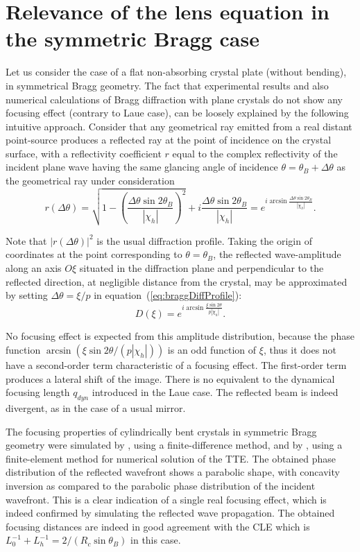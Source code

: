\documentclass[preprint]{iucr}              %
\begin{document}
\section{Relevance of the lens equation in the symmetric Bragg case}
\label{sec:BraggGeometry}

Let us consider the case of a flat non-absorbing crystal plate (without bending), in symmetrical Bragg geometry. The fact that experimental results and also numerical calculations \cite{Honkanen2018} of Bragg diffraction with plane crystals do not show any focusing effect (contrary to Laue case), can be loosely explained by the following intuitive approach. Consider that any geometrical ray emitted from a real distant point-source produces a reflected ray at the point of incidence on the crystal surface, with a reflectivity coefficient $r$ equal to the complex reflectivity of the incident plane wave having the same glancing angle of incidence $\theta=\theta_B+\Delta\theta$ as the geometrical ray under consideration
\begin{equation}
\label{eq:braggDiffProfile}
    r(\Delta\theta) = \sqrt{1-\left(\frac{\Delta\theta\sin2\theta_B}{|\chi_h|}\right)^2} + i \frac{\Delta\theta\sin2\theta_B}{|\chi_h|} =
    e^{i \arcsin{\frac{\Delta\theta \sin2\theta_B}{ |\chi_h|}}}.
\end{equation}

Note that $|r(\Delta\theta)|^2$ is the usual diffraction profile. Taking the origin of coordinates at the point corresponding to $\theta=\theta_B$, the reflected wave-amplitude along an axis $O\xi$ situated in the diffraction plane and perpendicular to the reflected direction, at negligible distance from the crystal, may be approximated by setting  $\Delta\theta=\xi/p$ in equation~(\ref{eq:braggDiffProfile}):
\begin{equation}
    D(\xi) = e^{i \arcsin{\frac{\xi \sin2\theta}{p |\chi_h|}}}.
\end{equation}

No focusing effect is expected from this amplitude distribution, because the phase function $\arcsin(\xi \sin2\theta/ (p |\chi_h|))$ is an odd function of $\xi$, thus it does not have a second-order term characteristic of a focusing effect. The first-order term produces a lateral shift of the image. There is no equivalent to the dynamical focusing length $q_{dyn}$ introduced in the Laue case. The reflected beam is indeed divergent, as in the case of a usual mirror.

The focusing properties of cylindrically bent crystals in symmetric Bragg geometry were simulated by \cite{sutter2010}, using a finite-difference method, and by \cite{honkanen2017, Honkanen2018}, using a finite-element method for numerical solution of the TTE. The obtained phase distribution of the reflected wavefront shows a parabolic shape, with concavity inversion as compared to the parabolic phase distribution of the incident wavefront. This is a clear indication of a single real focusing effect, which is indeed confirmed by simulating the reflected wave propagation. The obtained focusing distances are indeed in good agreement with the CLE which is $L_0^{-1}+L_h^{-1}=2/(R_c \sin\theta_B)$ in this case.
\end{document}
